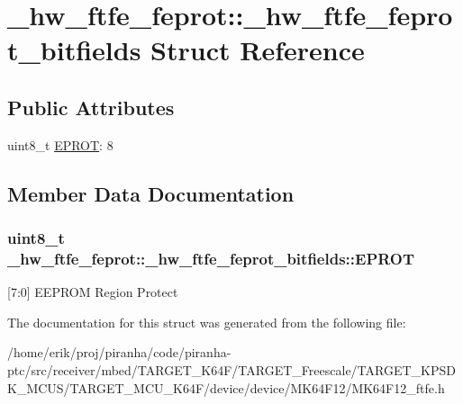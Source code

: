 \hypertarget{struct__hw__ftfe__feprot_1_1__hw__ftfe__feprot__bitfields}{}\section{\+\_\+hw\+\_\+ftfe\+\_\+feprot\+:\+:\+\_\+hw\+\_\+ftfe\+\_\+feprot\+\_\+bitfields Struct Reference}
\label{struct__hw__ftfe__feprot_1_1__hw__ftfe__feprot__bitfields}
\subsection*{Public Attributes}
\begin{DoxyCompactItemize}
\item 
uint8\+\_\+t \hyperlink{struct__hw__ftfe__feprot_1_1__hw__ftfe__feprot__bitfields_a58089153381e98dfb4a8c08fee8c674c}{E\+P\+R\+OT}\+: 8
\end{DoxyCompactItemize}


\subsection{Member Data Documentation}
\subsubsection[{\texorpdfstring{E\+P\+R\+OT}{EPROT}}]{\setlength{\rightskip}{0pt plus 5cm}uint8\+\_\+t \+\_\+hw\+\_\+ftfe\+\_\+feprot\+::\+\_\+hw\+\_\+ftfe\+\_\+feprot\+\_\+bitfields\+::\+E\+P\+R\+OT}\hypertarget{struct__hw__ftfe__feprot_1_1__hw__ftfe__feprot__bitfields_a58089153381e98dfb4a8c08fee8c674c}{}\label{struct__hw__ftfe__feprot_1_1__hw__ftfe__feprot__bitfields_a58089153381e98dfb4a8c08fee8c674c}
\mbox{[}7\+:0\mbox{]} E\+E\+P\+R\+OM Region Protect 

The documentation for this struct was generated from the following file\+:\begin{DoxyCompactItemize}
\item 
/home/erik/proj/piranha/code/piranha-\/ptc/src/receiver/mbed/\+T\+A\+R\+G\+E\+T\+\_\+\+K64\+F/\+T\+A\+R\+G\+E\+T\+\_\+\+Freescale/\+T\+A\+R\+G\+E\+T\+\_\+\+K\+P\+S\+D\+K\+\_\+\+M\+C\+U\+S/\+T\+A\+R\+G\+E\+T\+\_\+\+M\+C\+U\+\_\+\+K64\+F/device/device/\+M\+K64\+F12/M\+K64\+F12\+\_\+ftfe.\+h\end{DoxyCompactItemize}
